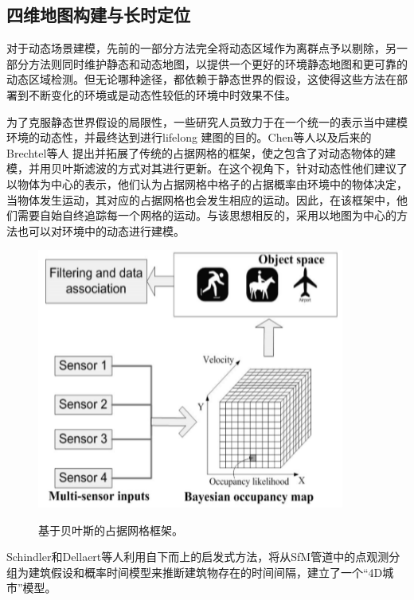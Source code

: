 \subsection{四维地图构建与长时定位}
\label{subsec:4Dmapping}
对于动态场景建模，先前的一部分方法完全将动态区域作为离群点予以剔除，另一部分方法则同时维护静态和动态地图，以提供一个更好的环境静态地图和更可靠的动态区域检测。但无论哪种途径，都依赖于静态世界的假设，这使得这些方法在部署到不断变化的环境或是动态性较低的环境中时效果不佳。

为了克服静态世界假设的局限性，一些研究人员致力于在一个统一的表示当中建模环境的动态性，并最终达到进行lifelong 建图的目的。Chen等人\cite{Chen2006Dynamic}以及后来的Brechtel等人\cite{Brechtel2010Recursive} 提出并拓展了传统的占据网格的框架，使之包含了对动态物体的建模，并用贝叶斯滤波的方式对其进行更新。在这个视角下，针对动态性他们建议了以物体为中心的表示，他们认为占据网格中格子的占据概率由环境中的物体决定，当物体发生运动，其对应的占据网格也会发生相应的运动。因此，在该框架中，他们需要自始自终追踪每一个网格的运动。与该思想相反的，采用以地图为中心的方法也可以对环境中的动态进行建模。

\begin{figure}[htbp]
	\centering
	\includegraphics[width=0.9\textwidth]{figs/2-3/bayesian.png}
	\label{fig: object tracking system}
	\caption{基于贝叶斯的占据网格框架。}
\end{figure}

Schindler和Dellaert等人\cite{Schindler2010Probabilistic}利用自下而上的启发式方法，将从SfM管道中的点观测分组为建筑假设和概率时间模型来推断建筑物存在的时间间隔，建立了一个“4D城市”模型。

